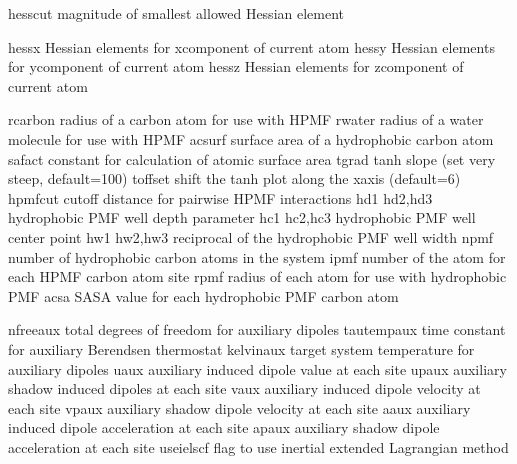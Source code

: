 \documentclass[letterpaper,11pt,english]{sphinxmanual}
\begin{document}
\sphinxAtStartPar
{}

\begin{sphinxVerbatim}[commandchars=\\\{\}]
hesscut         magnitude of smallest allowed Hessian element
\end{sphinxVerbatim}

\sphinxAtStartPar
{}

\begin{sphinxVerbatim}[commandchars=\\\{\}]
hessx           Hessian elements for x\PYGZhy{}component of current atom
hessy           Hessian elements for y\PYGZhy{}component of current atom
hessz           Hessian elements for z\PYGZhy{}component of current atom
\end{sphinxVerbatim}

\sphinxAtStartPar
{}

\begin{sphinxVerbatim}[commandchars=\\\{\}]
rcarbon         radius of a carbon atom for use with HPMF
rwater          radius of a water molecule for use with HPMF
acsurf          surface area of a hydrophobic carbon atom
safact          constant for calculation of atomic surface area
tgrad           tanh slope (set very steep, default=100)
toffset         shift the tanh plot along the x\PYGZhy{}axis (default=6)
hpmfcut         cutoff distance for pairwise HPMF interactions
hd1             hd2,hd3  hydrophobic PMF well depth parameter
hc1             hc2,hc3  hydrophobic PMF well center point
hw1             hw2,hw3  reciprocal of the hydrophobic PMF well width
npmf            number of hydrophobic carbon atoms in the system
ipmf            number of the atom for each HPMF carbon atom site
rpmf            radius of each atom for use with hydrophobic PMF
acsa            SASA value for each hydrophobic PMF carbon atom
\end{sphinxVerbatim}

\sphinxAtStartPar
{}

\begin{sphinxVerbatim}[commandchars=\\\{\}]
nfree\PYGZus{}aux       total degrees of freedom for auxiliary dipoles
tautemp\PYGZus{}aux     time constant for auxiliary Berendsen thermostat
kelvin\PYGZus{}aux      target system temperature for auxiliary dipoles
uaux            auxiliary induced dipole value at each site
upaux           auxiliary shadow induced dipoles at each site
vaux            auxiliary induced dipole velocity at each site
vpaux           auxiliary shadow dipole velocity at each site
aaux            auxiliary induced dipole acceleration at each site
apaux           auxiliary shadow dipole acceleration at each site
use\PYGZus{}ielscf      flag to use inertial extended Lagrangian method
\end{sphinxVerbatim}
\end{document}
